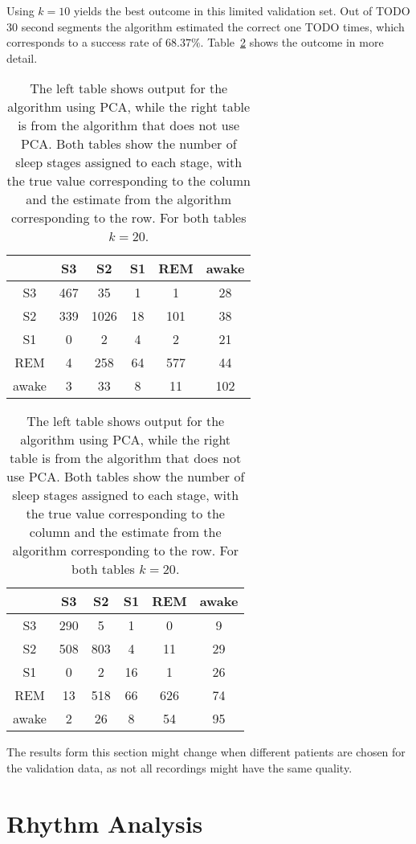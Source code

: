 Using $k=10$ yields the best outcome in this limited validation set. Out of TODO 30 second segments the algorithm estimated the correct one TODO times, which corresponds to a success rate of $68.37\%$. Table~\ref{tab:error_validation} shows the outcome in more detail.

\begin{table}
	\centering
	\begin{subtable}{0.48\textwidth}
		\begin{tabular}{c|ccccc}
			    & S3  & S2  & S1 & REM & awake \\
			\hline
			S3 & 467  & 35  & 1  & 1  & 28 \\
			S2 & 339  & 1026  & 18  & 101  & 38 \\
			S1 & 0  & 2  & 4  & 2  & 21 \\
			REM & 4  & 258  & 64  & 577  & 44 \\
			awake & 3  & 33  & 8  & 11  & 102 \\
		\end{tabular}
	\end{subtable}
	\hfill
	\begin{subtable}{0.48\textwidth}
		\begin{tabular}{c|ccccc}
			   & S3  & S2  & S1 & REM & awake \\
			\hline
			S3 & 290  & 5  & 1  & 0  & 9 \\
			S2 & 508  & 803  & 4  & 11  & 29 \\
			S1 & 0  & 2  & 16  & 1  & 26 \\
			REM & 13  & 518  & 66  & 626  & 74 \\
			awake & 2  & 26  & 8  & 54  & 95 \\
		\end{tabular}
	\end{subtable}
	
	\caption{The left table shows output for the algorithm using PCA, while the right table is from the algorithm that does not use PCA. Both tables show the number of sleep stages assigned to each stage, with the true value corresponding to the column and the estimate from the algorithm corresponding to the row. For both tables $k=20$.}
	\label{tab:error_validation}
\end{table}

The results form this section might change when different patients are chosen for the validation data, as not all recordings might have the same quality.


\section{Rhythm Analysis}
\label{sec:rhythm_analysis}

